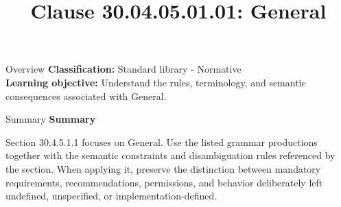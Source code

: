 \documentclass[10pt,letterpaper]{article}
\title{Clause 30.04.05.01.01: General}
\author{}
\date{}
\begin{document}
\maketitle
\begin{CornellOverviewBox}{Overview}
\textbf{Classification:} Standard library - Normative\\[2pt]
\textbf{Learning objective:} Understand the rules, terminology, and semantic consequences associated with General.
\end{CornellOverviewBox}\begin{CornellSummaryBox}{Summary}
{\sffamily\bfseries\color{Accent} Summary}\par\vspace{3pt}Section 30.4.5.1.1 focuses on General. Use the listed grammar productions together with the semantic constraints and disambiguation rules referenced by the section. When applying it, preserve the distinction between mandatory requirements, recommendations, permissions, and behavior deliberately left undefined, unspecified, or implementation-defined.
\end{CornellSummaryBox}
\end{document}
